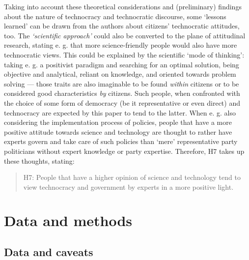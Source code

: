 \documentclass[
  12pt,
  english,
]{article}
\begin{document}
Taking into account these theoretical considerations and (preliminary)
findings about the nature of technocracy and technocratic discourse,
some `lessons learned' can be drawn from the authors about citizens'
technocratic attitudes, too. The \emph{`scientific approach'} could also
be converted to the plane of attitudinal research, stating e. g. that
more science-friendly people would also have more technocratic views.
This could be explained by the scientific `mode of thinking': taking e.
g. a positivist paradigm and searching for an optimal solution, being
objective and analytical, reliant on knowledge, and oriented towards
problem solving --- those traits are also imaginable to be found
\emph{within} citizens or to be considered good characteristics
\emph{by} citizens. Such people, when confronted with the choice of some
form of democracy (be it representative or even direct) and technocracy
are expected by this paper to tend to the latter. When e. g. also
considering the implementation process of policies, people that have a
more positive attitude towards science and technology are thought to
rather have experts govern and take care of such policies than `mere'
representative party politicians without expert knowledge or party
expertise. Therefore, H7 takes up these thoughts, stating:

\begin{quote}
H7: People that have a higher opinion of science and technology tend to
view technocracy and government by experts in a more positive light.
\end{quote}

\hypertarget{data-and-methods}{%
\section{Data and methods}\label{data-and-methods}}

\hypertarget{data-and-caveats}{%
\subsection{Data and caveats}\label{data-and-caveats}}
\end{document}
